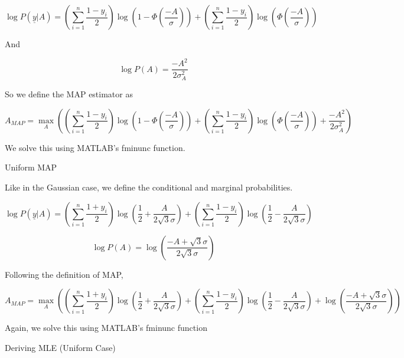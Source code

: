 \documentclass{amsart}
\begin{document}
\begin{equation}
\log P(\underline{y}|A) = \left( \sum_{i=1}^{n}\frac{1-y_i}{2} \right) \log(1-\Phi(\frac{-A}{\sigma})) + \left( \sum_{i=1}^{n}\frac{1-y_i}{2} \right)  \log(\Phi(\frac{-A}{\sigma}))
\end{equation}

And

\begin{equation}
\log P(A) = \frac{-A^2}{2\sigma_{A}^2}
\end{equation}

So we define the MAP estimator as

\begin{equation}
A_{MAP} = \max_{A}\left( \left( \sum_{i=1}^{n}\frac{1-y_i}{2} \right) \log(1-\Phi(\frac{-A}{\sigma})) + \left( \sum_{i=1}^{n}\frac{1-y_i}{2} \right)  \log(\Phi(\frac{-A}{\sigma})) + \frac{-A^2}{2\sigma_{A}^2} \right)
\end{equation}

We solve this using MATLAB's fminunc function.

\newpage

Uniform MAP

Like in the Gaussian case, we define the conditional and marginal probabilities.

\begin{equation}
\log P(\underline{y}|A) = \left(\sum_{i=1}^{n}\frac{1+y_i}{2}\right)\log\left( \frac{1}{2} + \frac{A}{2\sqrt{3}\sigma} \right) + \left(\sum_{i=1}^{n}\frac{1-y_i}{2}\right)\log\left( \frac{1}{2} - \frac{A}{2\sqrt{3}\sigma} \right)
\end{equation}

\begin{equation}
\log P(A) = \log(\frac{-A + \sqrt{3}\sigma}{2\sqrt{3}\sigma})
\end{equation}

Following the definition of MAP,

\begin{equation}
A_{MAP} = \max_{A} \left( \left(\sum_{i=1}^{n}\frac{1+y_i}{2}\right)\log\left( \frac{1}{2} + \frac{A}{2\sqrt{3}\sigma} \right) + \left(\sum_{i=1}^{n}\frac{1-y_i}{2}\right)\log\left( \frac{1}{2} - \frac{A}{2\sqrt{3}\sigma} \right) + \log(\frac{-A + \sqrt{3}\sigma}{2\sqrt{3}\sigma}) \right)
\end{equation}

Again, we solve this using MATLAB's fminunc function


\newpage

Deriving MLE (Uniform Case)
\end{document}
